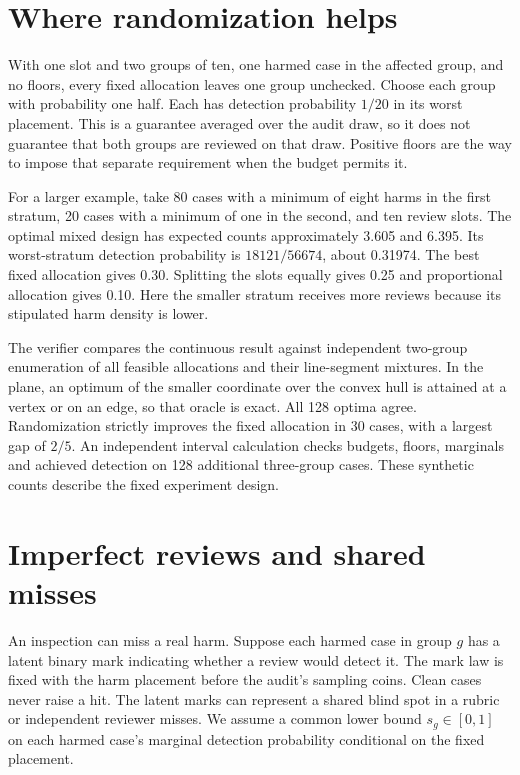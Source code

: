 \documentclass[11pt]{article}
\begin{document}
\section{Where randomization helps}
With one slot and two groups of ten, one harmed case in
the affected group, and no floors, every fixed allocation
leaves one group unchecked. Choose each group with probability
one half. Each has detection probability $1/20$ in its worst
placement. This is a guarantee averaged over the audit draw,
so it does not guarantee that both groups are reviewed on that
draw. Positive floors are the way to impose that separate
requirement when the budget permits it.

For a larger example, take 80 cases with a minimum of eight
harms in the first stratum, 20 cases with a minimum of one in
the second, and ten review slots. The optimal mixed design has
expected counts approximately 3.605 and 6.395. Its worst-stratum
detection probability is $18121/56674$, about 0.31974. The
best fixed allocation gives 0.30. Splitting the slots equally
gives 0.25 and proportional allocation gives 0.10. Here the
smaller stratum receives more reviews because its stipulated
harm density is lower.

The verifier compares the continuous result against independent
two-group enumeration of all feasible allocations and their
line-segment mixtures. In the plane, an optimum of the smaller
coordinate over the convex hull is attained at a vertex or on
an edge, so that oracle is exact. All 128 optima agree.
Randomization strictly improves the fixed allocation in 30
cases, with a largest gap of $2/5$. An independent interval
calculation checks budgets, floors, marginals and achieved
detection on 128 additional three-group cases. These synthetic
counts describe the fixed experiment design.

\section{Imperfect reviews and shared misses}
An inspection can miss a real harm. Suppose each harmed case in
group $g$ has a latent binary mark indicating whether a review
would detect it. The mark law is fixed with the harm placement
before the audit's sampling coins. Clean cases never raise a hit.
The latent marks can represent a shared blind spot in a rubric
or independent reviewer misses. We assume a common lower bound
$s_g\in[0,1]$ on each harmed case's marginal detection probability
conditional on the fixed placement.
\end{document}
